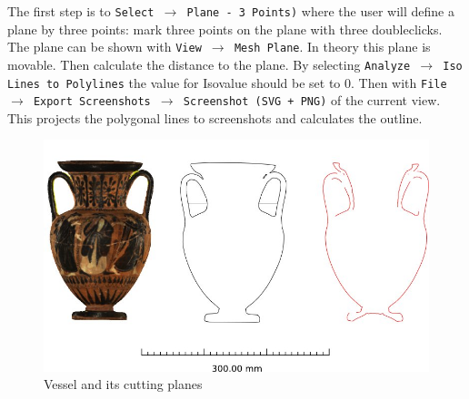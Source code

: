 The first step is to \texttt{Select $\rightarrow$ Plane - 3 Points)} where the user will define a plane by three points: mark three points on the plane with three doubleclicks. The plane can be shown with \texttt{View $\rightarrow$ Mesh Plane}. In theory this plane is movable. Then calculate the distance to the plane. By selecting \texttt{Analyze $\rightarrow$ Iso Lines to Polylines} the value for Isovalue should be set to 0. Then with \texttt{File  $\rightarrow$ Export Screenshots $\rightarrow$ Screenshot (SVG + PNG)} of the current view. This projects the polygonal lines  to screenshots and calculates the outline.
\begin{figure}[H]
\begin{center}
    \includegraphics[width=12cm]{figs/IV_670_1}
    \caption{Vessel and its cutting planes}
\end{center}
\end{figure}